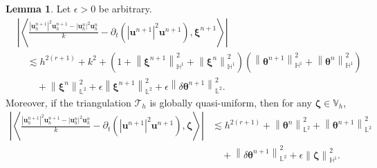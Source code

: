 \documentclass[11pt, reqno]{amsart}
\theoremstyle{definition}
\newtheorem{lemma}[theorem]{Lemma}
\theoremstyle{remark}
\numberwithin{equation}{section}
\newcommand{\bff}{\boldsymbol}
\newcommand{\bb}{\mathbb}
\newcommand{\norm}[2]{\left\|{#1}\right\|_{#2}}
\newcommand{\inpro}[2]{\left\langle#1,#2\right\rangle}
\newcommand{\abs}[1]{\left|{#1}\right|}
\begin{document}
\begin{lemma}\label{lem:psi psi dt un euler}
	Let $\epsilon>0$ be arbitrary.
	\begin{align}\label{equ:psi psi dt un euler}
		\nonumber
		&\left| \inpro{\frac{\abs{\bff{u}_h^{n+1}}^2 \bff{u}_h^{n+1}- \abs{\bff{u}_h^n}^2 \bff{u}_h^n}{k} - \partial_t \left(\abs{\bff{u}^{n+1}}^2 \bff{u}^{n+1}\right)}{\bff{\xi}^{n+1}} \right| 
		\\
		\nonumber
		&\quad
		\lesssim
		h^{2(r+1)} + k^2
		+
		\left(1+ \norm{\bff{\xi}^{n+1}}{\bb{H}^1}^2 + \norm{\bff{\xi}^n}{\bb{H}^1}^2\right) \left(\norm{\bff{\theta}^{n+1}}{\bb{H}^1}^2 + \norm{\bff{\theta}^n}{\bb{H}^1}^2 \right)
		\\
		&\qquad
		+
		\norm{\bff{\xi}^n}{\bb{L}^2}^2
		+
		\epsilon \norm{\bff{\xi}^{n+1}}{\bb{L}^2}^2
		+
		\epsilon \norm{\delta \bff{\theta}^{n+1}}{\bb{L}^2}^2.
	\end{align}
	Moreover, if the triangulation $\mathcal{T}_h$ is globally quasi-uniform, then for any $\bff{\zeta}\in \bb{V}_h$,
	\begin{align}\label{equ:dt psi zeta euler}
		\nonumber
		\left| \inpro{\frac{\abs{\bff{u}_h^{n+1}}^2 \bff{u}_h^{n+1}- \abs{\bff{u}_h^n}^2 \bff{u}_h^n}{k} - \partial_t \left(\abs{\bff{u}^{n+1}}^2 \bff{u}^{n+1}\right)}{\bff{\zeta}} \right| 
		&\lesssim
		h^{2(r+1)}
		+ 
		\norm{\bff{\theta}^n}{\bb{L}^2}^2 
		+ 
		\norm{\bff{\theta}^{n+1}}{\bb{L}^2}^2 
		\\
		&\quad
		+
		\norm{\delta \bff{\theta}^{n+1}}{\bb{L}^2}^2 
		+
		\epsilon \norm{\bff{\zeta}}{\bb{H}^1}^2.
	\end{align}
\end{lemma}
\end{document}
